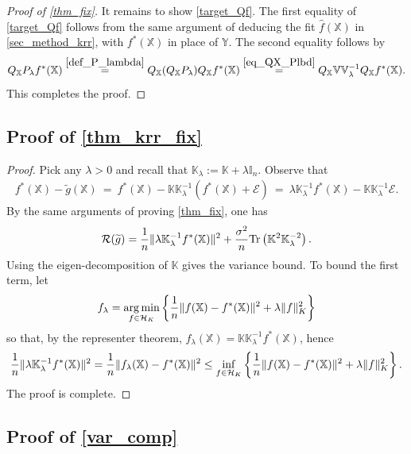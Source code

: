 \documentclass[11pt,twoside]{article}
\DeclareMathOperator*{\argmin}{arg\,min}
\def\VV{\mathbb{V}}
\def\KK{\mathbb{K}}
\def\II{\mathbb{I}}
\def\YY{\mathbb{Y}}
\def\XX{\mathbb{X}}
\def\cH{\mathcal H}
\def\cE{\mathcal E}
\def\cR{\mathcal R}
\def\wh{\widehat}
\def\wt{\widetilde}
\def\tr{{\rm Tr}}
\def\l{\left}
\def\r{\right}
\begin{document}
\begin{proof}[Proof of \cref{thm_fix}]
    It remains to show \eqref{target_Qf}. 
The first equality of \eqref{target_Qf} follows from the same argument of  deducing the fit $\wh f(\XX)$ in \cref{sec_method_krr},   with $f^*(\XX)$ in place of $\YY$.
    The second equality follows by 
    \[
     Q_{\XX}  P_\lambda  f^*(\XX) \overset{\eqref{def_P_lambda}}{=} Q_{\XX}  (Q_{\XX}  P_\lambda)  Q_{\XX} f^*(\XX) \overset{\eqref{eq_QX_Plbd}}{=} Q_{\XX} \VV\VV_\lambda^{-1}  Q_{\XX} f^*(\XX).
    \]
This completes the proof. 
\end{proof}



\subsection{Proof of \texorpdfstring{\cref{thm_krr_fix}}{\texttwoinferior}}\label{app_proof_thm_krr_fix}
\begin{proof}
    Pick any $\lambda >0$ and recall that $\KK_{\lambda} := \KK + \lambda  \II_n$.
        Observe that
        \begin{align*}
            f^*  (\XX) -    \wt g (\XX) 
           ~ =~  
        f^*  (\XX)  -   \KK \KK_{\lambda}^{-1} (f^*  (\XX) + \cE  ) 
           ~ =~     \lambda  \KK_{\lambda}^{-1}  f^*  (\XX) - \KK\KK_{\lambda}^{-1} \cE.
            \end{align*}
     By the  same arguments of proving \cref{thm_fix}, one has 
    \begin{align*}
        \cR(\wt g) = {1\over n}\|\lambda  \KK_{\lambda}^{-1}  f^*  (\XX)\|^2 + {\sigma^2 \over n} \tr\l(\KK^2\KK_{\lambda}^{-2}\r).
    \end{align*} 
    Using the eigen-decomposition of $\KK$ gives the variance bound. 
    To bound the first term, let
    \[
        f_\lambda =  \argmin_{f\in \cH_K}\l\{
            {1\over n}\|f(\XX) - f^*(\XX)\|^2 + \lambda \|f\|_K^2
        \r\}
    \]
    so that, by the representer theorem, $f_\lambda(\XX) = \KK \KK_{\lambda}^{-1} f^*(\XX)$, hence 
    \begin{align*}
        {1\over n}\|\lambda  \KK_{\lambda}^{-1}  f^*  (\XX)\|^2  =  {1\over n}\|f_\lambda(\XX) - f^*(\XX)\|^2 \le   \inf_{f\in \cH_K}\l\{
            {1\over n}\|f(\XX) - f^*(\XX)\|^2 + \lambda \|f\|_K^2
        \r\}.
    \end{align*}
     The proof is complete.
\end{proof}


\subsection{Proof of \cref{var_comp}}\label{app_proof_lemma_thm_fix}
\end{document}
